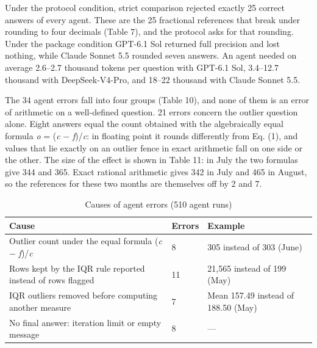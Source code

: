 \documentclass[default]{subfiles}
\begin{document}
{Under the protocol condition, strict comparison rejected exactly 25 correct answers of every agent. These are the 25 fractional references that break under rounding to four decimals (Table 7), and the protocol asks for that rounding. Under the package condition GPT-6.1 Sol returned full precision and lost nothing, while Claude Sonnet 5.5 rounded seven answers. An agent needed on average 2.6--2.7 thousand tokens per question with GPT-6.1 Sol, 3.4--12.7 thousand with DeepSeek-V4-Pro, and 18--22 thousand with Claude Sonnet 5.5.

The 34 agent errors fall into four groups (Table 10), and none of them is an error of arithmetic on a well-defined question. 21 errors concern the outlier question alone. Eight answers equal the count obtained with the algebraically equal formula \emph{o} = (\emph{c} $-$ \emph{f})/\emph{c}: in floating point it rounds differently from Eq. (1), and values that lie exactly on an outlier fence in exact arithmetic fall on one side or the other. The size of the effect is shown in Table 11: in July the two formulas give 344 and 365. Exact rational arithmetic gives 342 in July and 465 in August, so the references for these two months are themselves off by 2 and 7.

\begin{table}[htbp]
  \caption{Causes of agent errors (510 agent runs)}
  \label{tab:10}
  \centering\small
  \begin{tabular}{p{}p{}p{}}
    \hline
    \textbf{Cause} & \textbf{Errors} & \textbf{Example} \\ \hline
    Outlier count under the equal formula (\emph{c} $-$ \emph{f})/\emph{c} & 8 & 305 instead of 303 (June) \\
    Rows kept by the IQR rule reported instead of rows flagged & 11 & 21,565 instead of 199 (May) \\
    IQR outliers removed before computing another measure & 7 & Mean 157.49 instead of 188.50 (May) \\
    No final answer: iteration limit or empty message & 8 & --- \\
    \hline
  \end{tabular}
\end{table}

}
\end{document}
